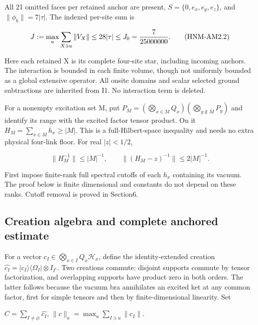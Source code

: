 All 21 omitted faces per retained anchor are present, \(S=\{0,e_x,e_y,e_z\}\), and \(\|\phi_b\|=7|\tau|\). The indexed per-site sum is

\begin{equation}
J:=\max_u\sum_{X\ni u}\|V_X\|\le28|\tau|\le J_0={7\over25000000}.
\tag{HNM-AM2.2}
\label{r29:am2:eq2}
\end{equation}

Here each retained X is its complete four-site star, including incoming anchors. The interaction is bounded in each finite volume, though not uniformly bounded as a global extensive operator. All onsite domains and scalar selected ground subtractions are inherited from I1. No interaction term is deleted.

For a nonempty excitation set M, put \(P_M=(\bigotimes_{x\in M}Q_x)(\bigotimes_{y\notin M}P_y)\) and identify its range with the excited factor tensor product. On it \(H_M=\sum_{x\in M}h_x\ge |M|\). This is a full-Hilbert-space inequality and needs no extra physical four-link floor. For real \(|z|<1/2\),

\begin{equation}
\|H_M^{-1}\|\le|M|^{-1},\qquad
\|(H_M-z)^{-1}\|\le2|M|^{-1}.
\tag{HNM-AM2.3}
\label{r29:am2:eq3}
\end{equation}

First impose finite-rank full spectral cutoffs of each \(h_x\) containing its vacuum. The proof below is finite dimensional and constants do not depend on these ranks. Cutoff removal is proved in Section6.

\hypertarget{r29-am2-creation-algebra-and-complete-anchored-estimate}{%
\subsection{Creation algebra and complete anchored estimate}\label{r29:am2:r29-am2-creation-algebra-and-complete-anchored-estimate}}

For a vector \(c_I\in\bigotimes_{x\in I}Q_x\mathcal H_x\), define the identity-extended creation \(\widehat{c_I}=|c_I\rangle\langle\Omega_I|\otimes I_{I^c}\). Two creations commute: disjoint supports commute by tensor factorization, and overlapping supports have product zero in both orders. The latter follows because the vacuum bra annihilates an excited ket at any common factor, first for simple tensors and then by finite-dimensional linearity. Set

\(C=\sum_{I\ne\varnothing}\widehat{c_I}\), \(\|c\|_a=\max_u\sum_{I\ni u}\|c_I\|\).

